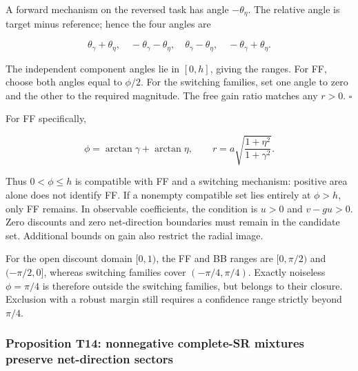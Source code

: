 \documentclass[11pt,a4paper]{article}
\begin{document}
\par
\noindent\begin{minipage}{\linewidth}

A forward mechanism on the reversed task has angle \(-\theta_\eta\). The
relative angle is target minus reference; hence the four angles are

\[
\theta_\gamma+\theta_\eta,\quad
-\theta_\gamma-\theta_\eta,\quad
\theta_\gamma-\theta_\eta,\quad
-\theta_\gamma+\theta_\eta.
\]

\end{minipage}\par

The independent component angles lie in \([0,h]\), giving the ranges.
For FF, choose both angles equal to \(\phi/2\). For the switching
families, set one angle to zero and the other to the required magnitude.
The free gain ratio matches any \(r>0\). \(\square\)

\par
\noindent\begin{minipage}{\linewidth}

For FF specifically,

\[
\phi=\arctan\gamma+\arctan\eta,\qquad
r=a\sqrt{\frac{1+\eta^2}{1+\gamma^2}}.
\]

\end{minipage}\par

Thus \(0<\phi\le h\) is compatible with FF and a switching mechanism:
positive area alone does not identify FF. If a nonempty compatible set
lies entirely at \(\phi>h\), only FF remains. In observable
coefficients, the condition is \(u>0\) and \(v-gu>0\). Zero discounts
and zero net-direction boundaries must remain in the candidate set.
Additional bounds on gain also restrict the radial image.

For the open discount domain \([0,1)\), the FF and BB ranges are
\([0,\pi/2)\) and \((-\pi/2,0]\), whereas switching families cover
\((-\pi/4,\pi/4)\). Exactly noiseless \(\phi=\pi/4\) is therefore
outside the switching families, but belongs to their closure. Exclusion
with a robust margin still requires a confidence range strictly beyond
\(\pi/4\).

\subsubsection{Proposition T14: nonnegative complete-SR mixtures
preserve net-direction
sectors}\label{proposition-t14-nonnegative-complete-sr-mixtures-preserve-net-direction-sectors}
\end{document}
